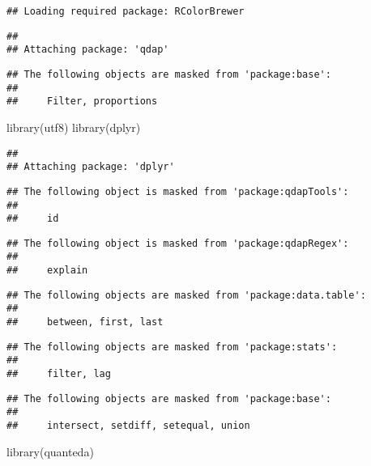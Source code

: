 \documentclass[
]{article}
\newenvironment{Shaded}{\begin{snugshade}}{\end{snugshade}}
\newcommand{\FunctionTok}[1]{\textcolor[rgb]{0.00,0.00,0.00}{#1}}
\newcommand{\NormalTok}[1]{#1}
\begin{document}
\begin{verbatim}
## Loading required package: RColorBrewer
\end{verbatim}

\begin{verbatim}
## 
## Attaching package: 'qdap'
\end{verbatim}

\begin{verbatim}
## The following objects are masked from 'package:base':
## 
##     Filter, proportions
\end{verbatim}

\begin{Shaded}
\begin{Highlighting}[]
\FunctionTok{library}\NormalTok{(utf8)}
\FunctionTok{library}\NormalTok{(dplyr)}
\end{Highlighting}
\end{Shaded}

\begin{verbatim}
## 
## Attaching package: 'dplyr'
\end{verbatim}

\begin{verbatim}
## The following object is masked from 'package:qdapTools':
## 
##     id
\end{verbatim}

\begin{verbatim}
## The following object is masked from 'package:qdapRegex':
## 
##     explain
\end{verbatim}

\begin{verbatim}
## The following objects are masked from 'package:data.table':
## 
##     between, first, last
\end{verbatim}

\begin{verbatim}
## The following objects are masked from 'package:stats':
## 
##     filter, lag
\end{verbatim}

\begin{verbatim}
## The following objects are masked from 'package:base':
## 
##     intersect, setdiff, setequal, union
\end{verbatim}

\begin{Shaded}
\begin{Highlighting}[]
\FunctionTok{library}\NormalTok{(quanteda)}
\end{Highlighting}
\end{Shaded}
\end{document}
